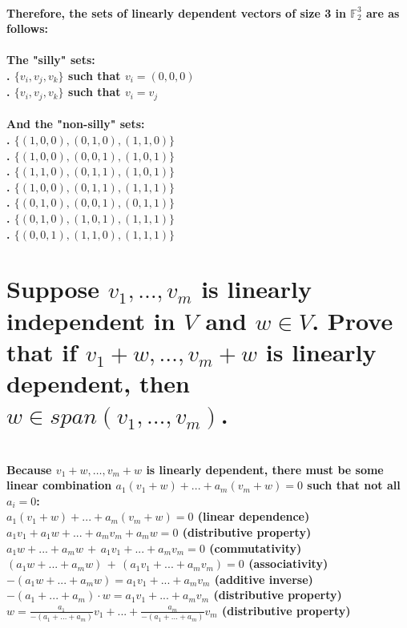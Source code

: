 \documentclass{article}
\begin{document}
\paragraph{\large
Therefore, the sets of linearly dependent vectors of size 3 in $\mathbb{F}_2^3$ are as follows:
\\\\The "silly" sets:
\\. $\{v_i, v_j, v_k\}$ such that $v_i = (0, 0, 0)$
\\. $\{v_i, v_j, v_k\}$ such that $v_i = v_j$
\\\\And the "non-silly" sets:
\\. $\{(1, 0, 0), (0, 1, 0), (1, 1, 0)\}$
\\. $\{(1, 0, 0), (0, 0, 1), (1, 0, 1)\}$
\\. $\{(1, 1, 0), (0, 1, 1), (1, 0, 1)\}$
\\. $\{(1, 0, 0), (0, 1, 1), (1, 1, 1)\}$
\\. $\{(0, 1, 0), (0, 0, 1), (0, 1, 1)\}$
\\. $\{(0, 1, 0), (1, 0, 1), (1, 1, 1)\}$
\\. $\{(0, 0, 1), (1, 1, 0), (1, 1, 1)\}$
}

\newpage

\section{Suppose $v_1,\ldots, v_m$ is linearly independent in $V$ and $w \in V$. Prove that if $v_1 + w, \ldots, v_m + w$ is linearly dependent, then $w \in span(v_1,\ldots, v_m)$.}

\paragraph{\large
\\Because $v_1 + w, \ldots, v_m + w$ is linearly dependent, there must be some linear combination $a_{1}(v_{1} + w) + ... + a_{m}(v_{m} + w) = 0$ such that not all $a_i = 0$:
\\\indent $a_{1}(v_{1} + w) + ... + a_{m}(v_{m} + w) = 0$ (linear dependence)
\\\indent $a_{1}v_{1} + a_{1}w + ... + a_{m}v_{m} + a_{m}w = 0$ (distributive property)
\\\indent $a_{1}w + ... + a_{m}w \, + \, a_{1}v_{1} + ... + a_{m}v_{m} = 0$ (commutativity)
\\\indent $(a_{1}w + ... + a_{m}w) \,+\, (a_{1}v_{1} + ... + a_{m}v_{m}) = 0$ (associativity)
\\\indent $-(a_{1}w + ... + a_{m}w) = a_{1}v_{1} + ... + a_{m}v_{m}$ (additive inverse)
\\\indent $-(a_{1} + ... + a_{m}) \cdot w = a_{1}v_{1} + ... + a_{m}v_{m}$ (distributive property)
\\\indent $w = \frac{a_{1}}{-(a_{1} + ... + a_{m})}v_{1} + ... + \frac{a_{m}}{-(a_{1} + ... + a_{m})}v_{m}$ (distributive property)}
\end{document}
